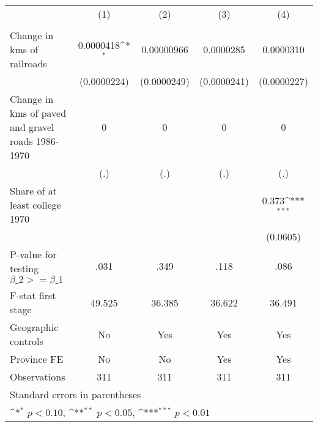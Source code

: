 {
\def\sym#1{\ifmmode^{#1}\else\(^{#1}\)\fi}
\begin{tabular}{l*{4}{c}}
\hline\hline
                &\multicolumn{1}{c}{(1)}&\multicolumn{1}{c}{(2)}&\multicolumn{1}{c}{(3)}&\multicolumn{1}{c}{(4)}\\
                &\multicolumn{1}{c}{}&\multicolumn{1}{c}{}&\multicolumn{1}{c}{}&\multicolumn{1}{c}{}\\
\hline
Change in kms of railroads&0.0000418\sym{*}  &0.00000966         &0.0000285         &0.0000310         \\
                &(0.0000224)         &(0.0000249)         &(0.0000241)         &(0.0000227)         \\
[1em]
Change in kms of paved and gravel roads 1986-1970&        0         &        0         &        0         &        0         \\
                &      (.)         &      (.)         &      (.)         &      (.)         \\
[1em]
Share of at least college 1970&                  &                  &                  &    0.373\sym{***}\\
                &                  &                  &                  & (0.0605)         \\
\hline
P-value for testing $\beta\_{2} >= \beta\_{1}$&     .031         &     .349         &     .118         &     .086         \\
F-stat first stage&   49.525         &   36.385         &   36.622         &   36.491         \\
Geographic controls&       No         &      Yes         &      Yes         &      Yes         \\
Province FE     &       No         &       No         &      Yes         &      Yes         \\
Observations    &      311         &      311         &      311         &      311         \\
\hline\hline
\multicolumn{5}{l}{\footnotesize Standard errors in parentheses}\\
\multicolumn{5}{l}{\footnotesize \sym{*} \(p<0.10\), \sym{**} \(p<0.05\), \sym{***} \(p<0.01\)}\\
\end{tabular}
}
